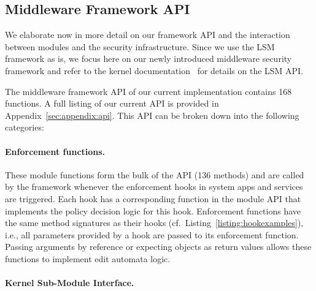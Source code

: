 \documentclass[letterpaper,twocolumn,10pt]{article}
\begin{document}
\subsection{Middleware Framework API}
\label{sec:arch:api}

We elaborate now in more detail on our framework API and the interaction between modules and the security infrastructure. Since we use the LSM framework as is, we focus here on our newly introduced middleware security framework and refer to the kernel documentation~\cite{lsmdocu} for details on the LSM API.

The middleware framework API of our current implementation contains 168 functions. A full listing of our current API is provided in Appendix~\ref{sec:appendix:api}. This API can be broken down into the following categories:

\paragraph{Enforcement functions.} These module functions form the bulk of the API (136 methods) and are called by the framework whenever the enforcement hooks in system apps and services are triggered. Each hook has a corresponding function in the module API that implements the policy decision logic for this hook. Enforcement functions have the same method signatures as their hooks (cf.~Listing~\ref{listing:hookexamples}), i.e., all parameters provided by a hook are passed to its enforcement function. Passing arguments by reference or expecting objects as return values allows these functions to implement edit automata logic.

\paragraph{Kernel Sub-Module Interface.}
\end{document}
